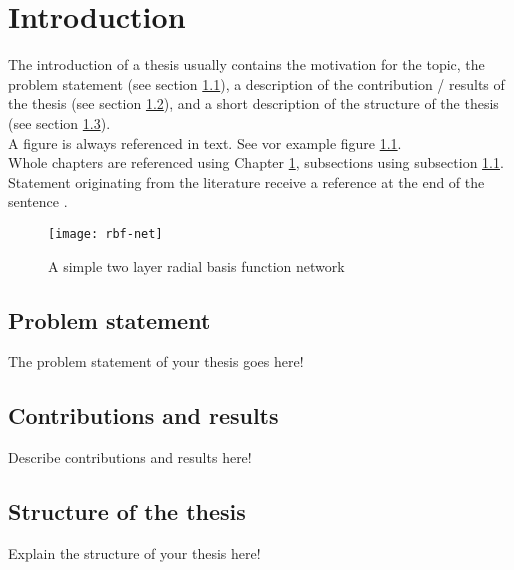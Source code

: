 %
%
\chapter{Introduction}
\label{cha:introduction}
The introduction of a thesis usually contains the motivation for the topic, the problem statement (see section \ref{sec:introduction:problemstatement}), a description of the  contribution / results of the thesis (see section \ref{sec:introduction:objective}), and a short description of the structure of the thesis (see section \ref{sec:introduction:structure}).\\


A figure is always referenced in text. See vor example figure \ref{fig:rbf-net}. \\ %

Whole chapters are referenced using  Chapter \ref{cha:introduction}, subsections using subsection \ref{sec:introduction:problemstatement}. \\ %

Statement originating from the literature receive a reference at the end of the sentence \cite{schwenker2001three}. 
\begin{figure}[htp]
\begin{center}
  \texttt{[image: rbf-net]} %
  \caption{A simple two layer radial basis function network}
  \label{fig:rbf-net}
\end{center}
\end{figure}

\section{Problem statement}
\label{sec:introduction:problemstatement}
The problem statement of your thesis goes here!


\section{Contributions and results}
\label{sec:introduction:objective}
Describe contributions and results here!


\section{Structure of the thesis}
\label{sec:introduction:structure}
Explain the structure of your thesis here!


